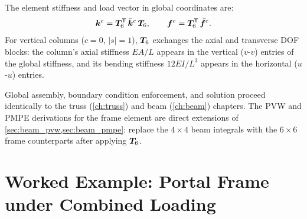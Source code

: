 The element stiffness and load vector in global coordinates are:
\begin{equation}
    \bm{k}^e = \bm{T}_6^{\mathsf{T}}\,\bar{\bm{k}}^e\,\bm{T}_6 ,
    \qquad
    \bm{f}^e = \bm{T}_6^{\mathsf{T}}\,\bar{\bm{f}}^e .
    \label{eq:frame_ke_global}
\end{equation}
For vertical columns ($c=0$, $|s|=1$), $\bm{T}_6$ exchanges the axial
and transverse DOF blocks: the column's axial stiffness $EA/L$ appears in
the vertical ($v$-$v$) entries of the global stiffness, and its bending
stiffness $12EI/L^3$ appears in the horizontal ($u$-$u$) entries.

\begin{remark}
Global assembly, boundary condition enforcement, and solution proceed
identically to the truss (\cref{ch:truss}) and beam (\cref{ch:beam})
chapters. The PVW and PMPE derivations for the frame element are direct
extensions of \cref{sec:beam_pvw,sec:beam_pmpe}: replace the $4\times4$
beam integrals with the $6\times6$ frame counterparts after applying
$\bm{T}_6$.
\end{remark}

\section{Worked Example: Portal Frame under Combined Loading}
\label{sec:frame_example}

